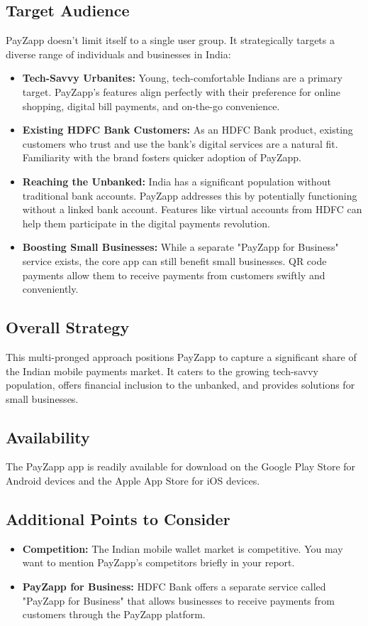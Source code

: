 \documentclass[12pt,a4paper]{report}
\begin{document}
\subsection{Target Audience}
PayZapp doesn't limit itself to a single user group. It strategically targets a diverse range of individuals and businesses in India:
\begin{itemize}
    \item \textbf{Tech-Savvy Urbanites:} Young, tech-comfortable Indians are a primary target. PayZapp's features align perfectly with their preference for online shopping, digital bill payments, and on-the-go convenience.
    \item \textbf{Existing HDFC Bank Customers:} As an HDFC Bank product, existing customers who trust and use the bank's digital services are a natural fit. Familiarity with the brand fosters quicker adoption of PayZapp.
    \item \textbf{Reaching the Unbanked:} India has a significant population without traditional bank accounts. PayZapp addresses this by potentially functioning without a linked bank account. Features like virtual accounts from HDFC can help them participate in the digital payments revolution.
    \item \textbf{Boosting Small Businesses:} While a separate "PayZapp for Business" service exists, the core app can still benefit small businesses. QR code payments allow them to receive payments from customers swiftly and conveniently.
\end{itemize}

\subsection{Overall Strategy}
This multi-pronged approach positions PayZapp to capture a significant share of the Indian mobile payments market. It caters to the growing tech-savvy population, offers financial inclusion to the unbanked, and provides solutions for small businesses.

\subsection{Availability}
The PayZapp app is readily available for download on the Google Play Store for Android devices and the Apple App Store for iOS devices.

\subsection{Additional Points to Consider}
\begin{itemize}
    \item \textbf{Competition:} The Indian mobile wallet market is competitive. You may want to mention PayZapp's competitors briefly in your report.
    \item \textbf{PayZapp for Business:} HDFC Bank offers a separate service called "PayZapp for Business" that allows businesses to receive payments from customers through the PayZapp platform.
\end{itemize}
\end{document}
